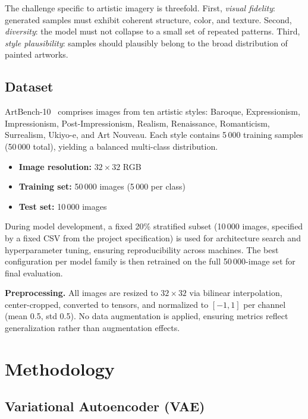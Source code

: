 \documentclass[runningheads]{llncs}
\begin{document}
The challenge specific to artistic imagery is threefold. First, \emph{visual fidelity}: generated samples must exhibit coherent structure, color, and texture. Second, \emph{diversity}: the model must not collapse to a small set of repeated patterns. Third, \emph{style plausibility}: samples should plausibly belong to the broad distribution of painted artworks.

\subsection{Dataset}

ArtBench-10~\cite{liao2022} comprises images from ten artistic styles: Baroque, Expressionism, Impressionism, Post-Impressionism, Realism, Renaissance, Romanticism, Surrealism, Ukiyo-e, and Art Nouveau. Each style contains 5\,000 training samples (50\,000 total), yielding a balanced multi-class distribution.

\begin{itemize}
    \item \textbf{Image resolution:} $32 \times 32$ RGB
    \item \textbf{Training set:} 50\,000 images (5\,000 per class)
    \item \textbf{Test set:} 10\,000 images
\end{itemize}

During model development, a fixed 20\% stratified subset (10\,000 images, specified by a fixed CSV from the project specification) is used for architecture search and hyperparameter tuning, ensuring reproducibility across machines. The best configuration per model family is then retrained on the full 50\,000-image set for final evaluation.

\noindent\textbf{Preprocessing.} All images are resized to $32 \times 32$ via bilinear interpolation, center-cropped, converted to tensors, and normalized to $[-1, 1]$ per channel (mean 0.5, std 0.5). No data augmentation is applied, ensuring metrics reflect generalization rather than augmentation effects.

\section{Methodology}\label{sec:methodology}

\subsection{Variational Autoencoder (VAE)}
\end{document}
